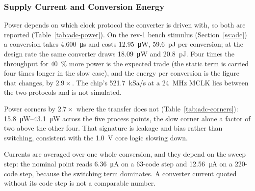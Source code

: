 %

\subsubsection{Supply Current and Conversion Energy}\label{sss:adc-power}

Power depends on which clock protocol the converter is driven with, so both are
reported (Table~\ref{tab:adc-power}). On the rev-1 bench stimulus
(Section~\ref{ss:adc}) a conversion takes \SI{4.600}{\micro\second} and costs \SI{12.95}{\micro\watt},
\SI{59.6}{\pico\joule} per conversion; at the design rate the same converter
draws \SI{18.09}{\micro\watt} and \SI{20.8}{\pico\joule}. Four times the
throughput for \SI{40}{\percent} more power is the expected trade (the static
term is carried four times longer in the slow case), and the energy per
conversion is the figure that changes, by \(2.9\times\). The chip's
\SI{521.7}{kSa/s} at a \SI{24}{\mega\hertz} MCLK lies between the two
protocols and is not simulated.

Power corners by \(2.7\times\) where the transfer does not
(Table~\ref{tab:adc-corners}): \SIrange{15.8}{43.1}{\micro\watt} across the five
process points, the slow corner alone a factor of two above the other four. That
signature is leakage and bias rather than switching, consistent with the
\SI{1.0}{\volt} core logic slowing down.

Currents are averaged over one whole conversion, and they depend on the sweep
step: the nominal point reads \SI{6.36}{\micro\ampere} on a 63-code step and
\SI{12.56}{\micro\ampere} on a 220-code step, because the switching term
dominates. A converter current quoted without its code step is not a comparable
number.
